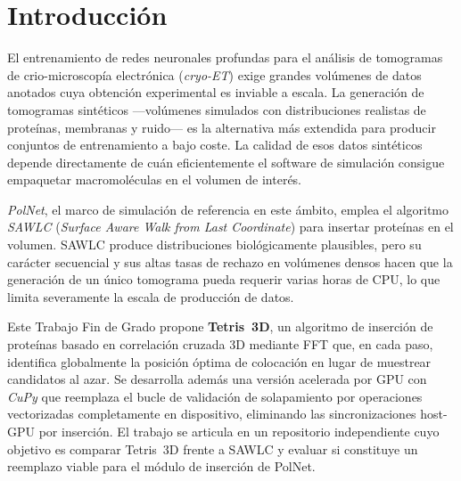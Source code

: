 

\chapter{Introducción}

El entrenamiento de redes neuronales profundas para el análisis de tomogramas de crio-microscopía
electrónica (\textit{cryo-ET}) exige grandes volúmenes de datos anotados cuya obtención
experimental es inviable a escala. La generación de tomogramas sintéticos —volúmenes simulados
con distribuciones realistas de proteínas, membranas y ruido— es la alternativa más extendida
para producir conjuntos de entrenamiento a bajo coste. La calidad de esos datos sintéticos
depende directamente de cuán eficientemente el software de simulación consigue empaquetar
macromoléculas en el volumen de interés.


\textit{PolNet}, el marco de simulación de referencia en este ámbito, emplea el algoritmo
\textit{SAWLC} (\textit{Surface Aware Walk from Last Coordinate}) para insertar proteínas en el
volumen. SAWLC produce distribuciones biológicamente plausibles, pero su carácter secuencial y
sus altas tasas de rechazo en volúmenes densos hacen que la generación de un único tomograma
pueda requerir varias horas de CPU, lo que limita severamente la escala de producción de datos.

Este Trabajo Fin de Grado propone \textbf{Tetris~3D}, un algoritmo de inserción de proteínas
basado en correlación cruzada 3D mediante FFT que, en cada paso, identifica globalmente la
posición óptima de colocación en lugar de muestrear candidatos al azar. Se desarrolla además
una versión acelerada por GPU con \textit{CuPy} que reemplaza el bucle de validación de
solapamiento por operaciones vectorizadas completamente en dispositivo, eliminando las
sincronizaciones host-GPU por inserción. El trabajo se articula en un repositorio independiente
cuyo objetivo es comparar Tetris~3D frente a SAWLC y evaluar si constituye un reemplazo viable
para el módulo de inserción de PolNet.

